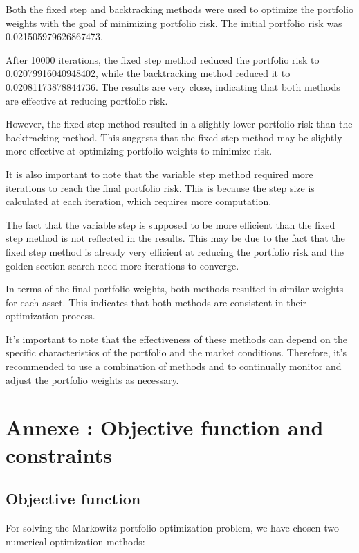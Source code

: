 \documentclass[12pt]{article}
\begin{document}
Both the fixed step and backtracking methods were used to optimize the portfolio weights with the goal of minimizing portfolio risk. The initial portfolio risk was 0.021505979626867473. 

After 10000 iterations, the fixed step method reduced the portfolio risk to 0.02079916040948402, while the backtracking method reduced it to 0.02081173878844736. The results are very close, indicating that both methods are effective at reducing portfolio risk. 

However, the fixed step method resulted in a slightly lower portfolio risk than the backtracking method. This suggests that the fixed step method may be slightly more effective at optimizing portfolio weights to minimize risk. 

It is also important to note that the variable step method required more iterations to reach the final portfolio risk. This is because the step size is calculated at each iteration, which requires more computation. 

The fact that the variable step is supposed to be more efficient than the fixed step method is not reflected in the results. This may be due to the fact that the fixed step method is already very efficient at reducing the portfolio risk and the golden section search need more iterations to converge.

In terms of the final portfolio weights, both methods resulted in similar weights for each asset. This indicates that both methods are consistent in their optimization process. 

It's important to note that the effectiveness of these methods can depend on the specific characteristics of the portfolio and the market conditions. Therefore, it's recommended to use a combination of methods and to continually monitor and adjust the portfolio weights as necessary.



\section*{Annexe : Objective function and constraints}

\subsection*{Objective function}

For solving the Markowitz portfolio optimization problem, we have chosen two numerical optimization methods:
\end{document}
